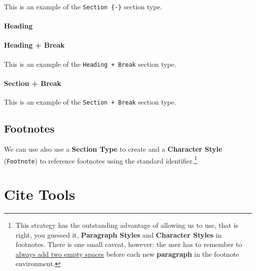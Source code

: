 \documentclass[
  12pt,
  a4paper,
  oneside,
  titlepage,
  toclink=all,
  toc=bibliography]{scrbook}
\theoremstyle{definition}
\theoremstyle{plain}
\theoremstyle{plain}
\theoremstyle{plain}
\theoremstyle{plain}
\theoremstyle{definition}
\theoremstyle{definition}
\theoremstyle{plain}
\theoremstyle{remark}
\begin{document}
\protect\hypertarget{scriv36}{}{}

This is an example of the \texttt{Section\ \{-\}} section type.

\hypertarget{sec-scriv37}{%
\subsubsection{Heading}\label{sec-scriv37}}

\hypertarget{sec-scriv38}{%
\subsubsection{Heading + Break}\label{sec-scriv38}}

This is an example of the \texttt{Heading\ +\ Break} section type.

\newpage{}

\newpage{}

\hypertarget{sec-scriv39}{%
\subsubsection{Section + Break}\label{sec-scriv39}}

This is an example of the \texttt{Section\ +\ Break} section type.

\hypertarget{sec-scriv40}{%
\section{Footnotes}\label{sec-scriv40}}

\protect\hypertarget{scriv40}{}{}

We can use also use a \textbf{Section Type} to create and a
\textbf{Character Style} (\texttt{Footnote}) to reference footnotes
using the standard identifier.\footnote{\protect\hypertarget{scriv41}{}{}
  This strategy has the outstanding advantage of allowing us to use,
  that is right, you guessed it, \textbf{Paragraph Styles} and
  \textbf{Character Styles} in footnotes. There is one small caveat,
  however: the user has to remember to \ul{always add two empty spaces}
  before each new \textbf{paragraph} in the footnote environment.}

\hypertarget{sec-scriv42}{%
\chapter{Cite Tools}\label{sec-scriv42}}

\protect\hypertarget{scriv42}{}{}
\end{document}
